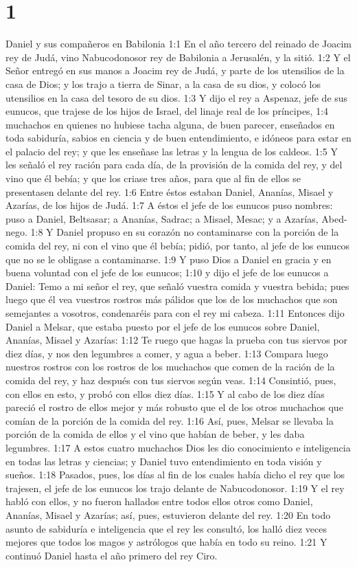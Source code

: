 
\chapter{1}


Daniel y sus compañeros en Babilonia  
1:1 En el año tercero del reinado de Joacim rey de Judá, vino Nabucodonosor rey de Babilonia a Jerusalén, y la sitió. 
1:2 Y el Señor entregó en sus manos a Joacim rey de Judá, y parte de los utensilios de la casa de Dios; y los trajo a tierra de Sinar, a la casa de su dios, y colocó los utensilios en la casa del tesoro de su dios.  
1:3 Y dijo el rey a Aspenaz, jefe de sus eunucos, que trajese de los hijos de Israel, del linaje real de los príncipes,  
1:4 muchachos en quienes no hubiese tacha alguna, de buen parecer, enseñados en toda sabiduría, sabios en ciencia y de buen entendimiento, e idóneos para estar en el palacio del rey; y que les enseñase las letras y la lengua de los caldeos. 
1:5 Y les señaló el rey ración para cada día, de la provisión de la comida del rey, y del vino que él bebía; y que los criase tres años, para que al fin de ellos se presentasen delante del rey.  
1:6 Entre éstos estaban Daniel, Ananías, Misael y Azarías, de los hijos de Judá.  
1:7 A éstos el jefe de los eunucos puso nombres: puso a Daniel, Beltsasar; a Ananías, Sadrac; a Misael, Mesac; y a Azarías, Abed-nego.  
1:8 Y Daniel propuso en su corazón no contaminarse con la porción de la comida del rey, ni con el vino que él bebía; pidió, por tanto, al jefe de los eunucos que no se le obligase a contaminarse.  
1:9 Y puso Dios a Daniel en gracia y en buena voluntad con el jefe de los eunucos;  
1:10 y dijo el jefe de los eunucos a Daniel: Temo a mi señor el rey, que señaló vuestra comida y vuestra bebida; pues luego que él vea vuestros rostros más pálidos que los de los muchachos que son semejantes a vosotros, condenaréis para con el rey mi cabeza.  
1:11 Entonces dijo Daniel a Melsar, que estaba puesto por el jefe de los eunucos sobre Daniel, Ananías, Misael y Azarías:  
1:12 Te ruego que hagas la prueba con tus siervos por diez días, y nos den legumbres a comer, y agua a beber.  
1:13 Compara luego nuestros rostros con los rostros de los muchachos que comen de la ración de la comida del rey, y haz después con tus siervos según veas.  
1:14 Consintió, pues, con ellos en esto, y probó con ellos diez días.  
1:15 Y al cabo de los diez días pareció el rostro de ellos mejor y más robusto que el de los otros muchachos que comían de la porción de la comida del rey.  
1:16 Así, pues, Melsar se llevaba la porción de la comida de ellos y el vino que habían de beber, y les daba legumbres.  
1:17 A estos cuatro muchachos Dios les dio conocimiento e inteligencia en todas las letras y ciencias; y Daniel tuvo entendimiento en toda visión y sueños. 
1:18 Pasados, pues, los días al fin de los cuales había dicho el rey que los trajesen, el jefe de los eunucos los trajo delante de Nabucodonosor.  
1:19 Y el rey habló con ellos, y no fueron hallados entre todos ellos otros como Daniel, Ananías, Misael y Azarías; así, pues, estuvieron delante del rey.  
1:20 En todo asunto de sabiduría e inteligencia que el rey les consultó, los halló diez veces mejores que todos los magos y astrólogos que había en todo su reino.  
1:21 Y continuó Daniel hasta el año primero del rey Ciro.  


